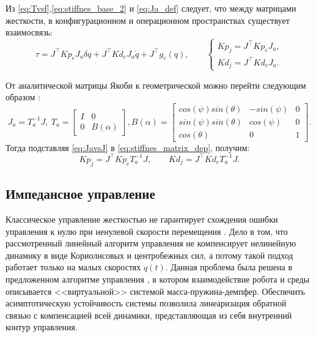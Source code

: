 Из \eqref{eq:Tvsf},\eqref{eq:stiffnes_base_2} и \eqref{eq:Ja_def} следует, что между матрицами жесткости, в конфигурационном и операционном пространствах существует взаимосвязь:
\begin{equation}
  \tau = J^\top Kp_{e}J_a \delta q + J^\top Kd_e J_a\dot{q} + J^\top g_e(q),\qquad \begin{cases}
    Kp_{j} = J^\top Kp_{e}J_a,\\
    Kd_{j} = J^\top Kd_{e}J_a.
  \end{cases}
  \label{eq:stiffnes_matrix_dep}
\end{equation}

От аналитической матрицы Якоби к геометрической можно перейти следующим образом \cite{Spong2006}:
\begin{equation}
  J_a = T_a^{-1} J,\  T_a = \begin{bmatrix} I & 0 \\ 0 &  B(\alpha) \end{bmatrix}, B(\alpha) = \begin{bmatrix} cos(\psi)sin(\theta) & -sin(\psi) & 0 \\ sin(\psi)sin(\theta) & cos(\psi) & 0\\ cos(\theta) & 0 & 1 \end{bmatrix}.
  \label{eq:JavsJ}
\end{equation}
Тогда подставляя \eqref{eq:JavsJ} в \eqref{eq:stiffnes_matrix_dep}, получим:
\begin{equation}
  Kp_{j} = J^\top Kp_{e} T_a^{-1} J, \qquad Kd_{j} = J^\top Kd_{e} T_a^{-1} J.
  \label{eq:stiffnes_matrix_dep_final}
\end{equation}

\subsection{Импедансное управление}
Классическое управление жесткостью не гарантирует схождения ошибки управления к нулю при ненулевой скорости перемещения \cite{indirect_to_direct}. Дело в том, что рассмотренный линейный алгоритм управления не компенсирует нелинейную динамику в виде Кориолисовых и центробежных сил, а потому такой подход работает только на малых скоростях  $\dot{q}(t)$. Данная проблема была решена в предложенном  алгоритме управления \cite{Yoshikawa2000}, в котором  взаимодействие робота и среды описывается <<виртуальной>> системой масса-пружина-демпфер. Обеспечить асимптотическую устойчивость системы позволила линеаризация обратной связью с компенсацией всей динамики, представляющая из себя внутренний контур управления.\\

